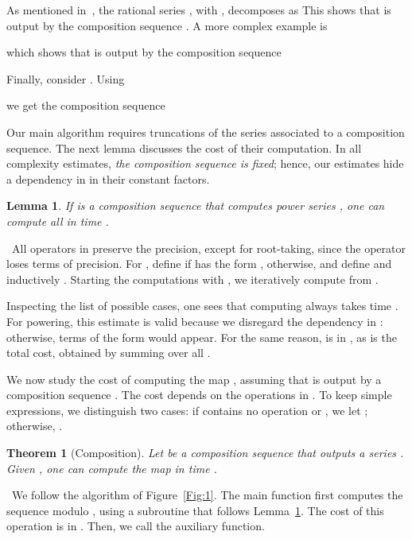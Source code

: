 \documentclass{sig-alternate}
\def\myproof{\noindent{\sc Proof.}~}
\def\foorp{\hfill}
\newtheorem{theorem}{Theorem}
\newtheorem{Lemma}{Lemma}
\begin{document}
\smallskip{}  As mentioned in~\cite{Pan98}, the
rational series , with ,
decomposes as
 This shows that  is output by the
composition sequence .
A more complex example is 

which shows that  is output by the composition
sequence

Finally, consider 
. Using 

we get the composition sequence


\smallskip{} Our
main algorithm requires truncations of the series 
associated to a composition sequence. The next lemma discusses the
cost of their computation. In all complexity estimates, \emph{the
composition sequence  is fixed}; hence, our estimates hide a
dependency in  in their constant factors.

\begin{Lemma}\label{Lemma:0}
  If  is a composition sequence that computes
  power series , one can compute all  in
  time .
\end{Lemma}
\myproof All operators in  preserve the precision, except for
root-taking, since the operator  loses 
terms of precision. For , define  if
 has the form , 
otherwise, and define  and inductively . Starting the computations with , we iteratively
compute  from .

Inspecting the list of possible cases, one sees that computing 
always takes time . For powering, this estimate is
valid because we disregard the dependency in : otherwise, terms of
the form  would appear. For the same reason, 
is in , as is the total cost, obtained by summing over all
. \foorp

\smallskip{}  We
now study the cost of computing the map , assuming that
 is output by a composition sequence . The cost
depends on the operations in . To keep simple expressions, we
distinguish two cases: if  contains no operation
 or , we let ; otherwise, .

\begin{theorem}[Composition]\label{Prop:0}
 Let  be a composition sequence that outputs a
 series . Given , one can compute the map
  in time .
\end{theorem}
\myproof We follow the algorithm of Figure~\ref{Fig:1}. The main
function first computes the sequence  modulo ,
using a subroutine  that follows
Lemma~\ref{Lemma:0}. The cost  of this operation is in
. Then, we call the auxiliary 
function.
\end{document}
